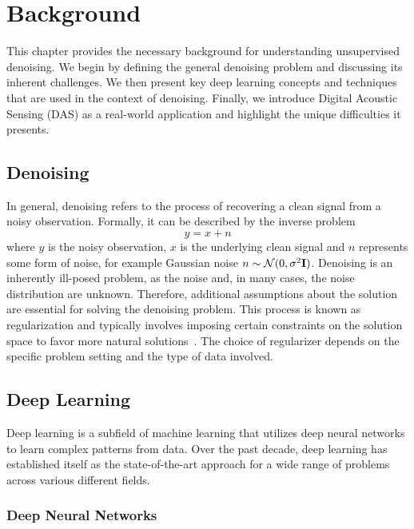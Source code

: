 \chapter{Background}\label{ch:background}

This chapter provides the necessary background for understanding unsupervised denoising.
We begin by defining the general denoising problem and discussing its inherent challenges.
We then present key deep learning concepts and techniques that are used in the context of denoising.
Finally, we introduce Digital Acoustic Sensing (DAS) as a real-world application and highlight the unique difficulties 
it presents.

\section{Denoising}

In general, denoising refers to the process of recovering a clean signal from a noisy observation.
Formally, it can be described by the inverse problem 
\begin{equation}
    y = x + n
\end{equation}
where $y$ is the noisy observation, $x$ is the underlying clean signal and $n$ represents some form of noise, for
example Gaussian noise $n \sim \mathcal{N}(0,\sigma^2\mathbf{I})$.
Denoising is an inherently ill-posed problem, as the noise and, in many cases, the noise distribution are unknown.
Therefore, additional assumptions about the solution are essential for solving the denoising problem. 
This process is known as regularization and typically involves imposing certain constraints on the solution space to 
favor more natural solutions~\cite{XXX}. 
The choice of regularizer depends on the specific problem setting and the type of data involved.

\section{Deep Learning}

Deep learning is a subfield of machine learning that utilizes deep neural networks to learn complex patterns from data. 
Over the past decade, deep learning has established itself as the state-of-the-art approach for a wide range of problems
across various different fields.

\subsection{Deep Neural Networks}

